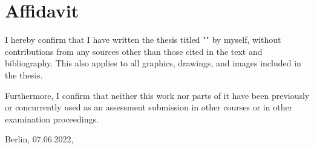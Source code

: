 \clearpage
{}
{}

\chapter*{Affidavit}
I hereby confirm that I have written the thesis titled "\thetitle" by myself, without contributions from any sources other than those cited in the text and bibliography. This also applies to all graphics, drawings, and images included in the thesis.

Furthermore, I confirm that neither this work nor parts of it have been previously or concurrently used as an assessment submission in other courses or in other examination proceedings.

Berlin, 07.06.2022,


